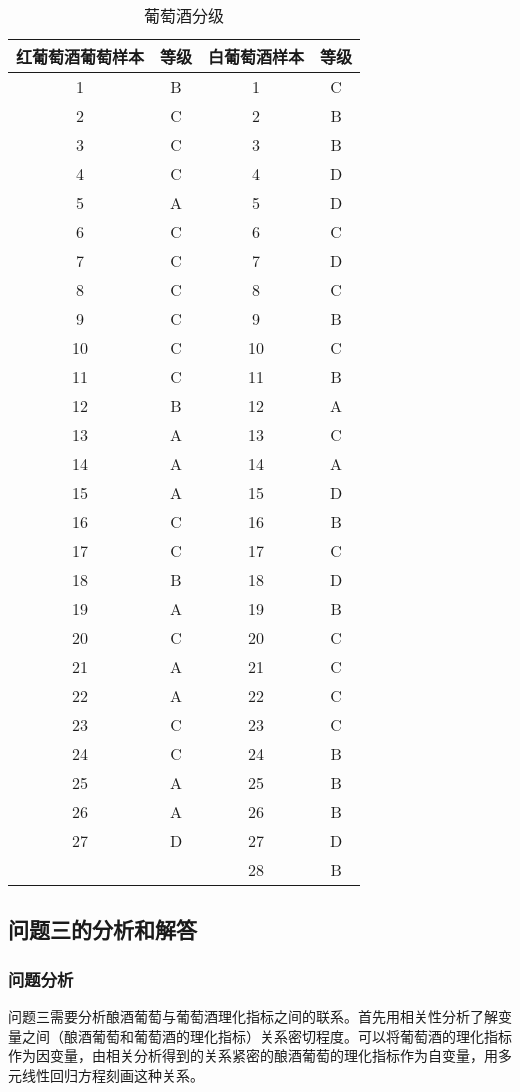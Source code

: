 \documentclass[UTF8,12.05pt]{ctexart}
\begin{document}
 \begin{table}[H]
 \centering
 \caption{葡萄酒分级}
  \begin{tabular}{|c|c|c|c|}
    \hline
    红葡萄酒葡萄样本 & 等级 & 白葡萄酒样本&等级\\
    \hline
    1&B&1&C \\ \hline
    2&C&2&B \\ \hline
    3&C&3&B\\ \hline
    4&C&4&D\\ \hline
    5& A&5&D\\ \hline
    6& C&6&C\\ \hline
    7& C&7&D\\ \hline
    8& C&8&C\\ \hline
    9& C&9&B\\ \hline
    10&C&10&C\\ \hline
    11&C&11& B\\ \hline
    12& B&12&A\\ \hline
    13&A&13&C\\ \hline
    14& A&14&A\\ \hline
    15& A&15&D\\ \hline
    16& C&16&B\\ \hline
    17& C&17&C\\ \hline
    18& B&18&D\\ \hline
    19& A&19&B\\ \hline
    20&C&20&C\\ \hline
    21& A&21&C\\ \hline
    22& A&22&C\\ \hline
    23&C&23&C\\ \hline
    24&C&24&B \\ \hline
    25& A&25&B\\ \hline
    26& A&26&B\\ \hline
    27& D&27&D\\ \hline
    & &28&B\\
    \hline
    \end{tabular}
    \end{table}
\subsection{\heiti{}问题三的分析和解答}
\subsubsection{\heiti{}问题分析}
问题三需要分析酿酒葡萄与葡萄酒理化指标之间的联系。首先用相关性分析了解变量之间（酿酒葡萄和葡萄酒的理化指标）关系密切程度。可以将葡萄酒的理化指标作为因变量，由相关分析得到的关系紧密的酿酒葡萄的理化指标作为自变量，用多元线性回归方程刻画这种关系。
\end{document}
